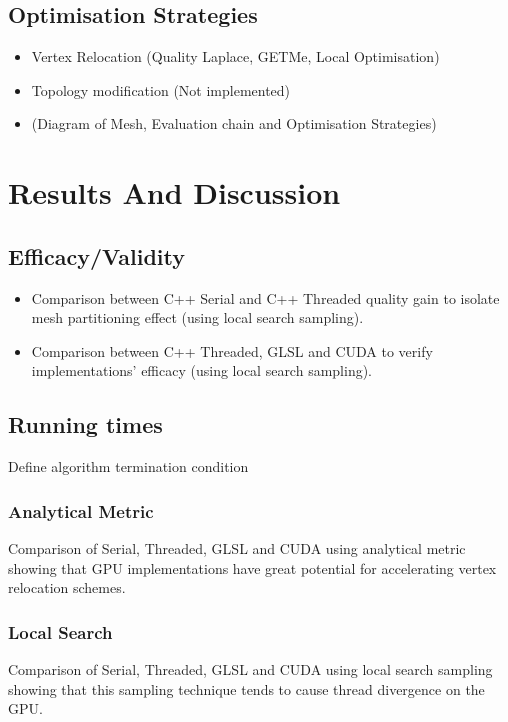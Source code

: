 \documentclass[preprint,12pt]{elsarticle}
\begin{document}
\subsection{Optimisation Strategies}
\label{}
\begin{itemize}
\item Vertex Relocation (Quality Laplace, GETMe, Local Optimisation)
\item Topology modification (Not implemented)
\item (Diagram of Mesh, Evaluation chain and Optimisation Strategies)
\end{itemize}

\section{Results And Discussion}
\label{}

\subsection{Efficacy/Validity}
\label{}
\begin{itemize}
\item Comparison between C++ Serial and C++ Threaded quality gain to isolate mesh partitioning effect (using local search sampling).
\item Comparison between C++ Threaded, GLSL and CUDA to verify implementations' efficacy (using local search sampling).
\end{itemize}


\subsection{Running times}
\label{}
Define algorithm termination condition

\subsubsection{Analytical Metric}
\label{}
Comparison of Serial, Threaded, GLSL and CUDA using analytical metric showing that GPU implementations have great potential for accelerating vertex relocation schemes.

\subsubsection{Local Search}
\label{}
Comparison of Serial, Threaded, GLSL and CUDA using local search sampling showing that this sampling technique tends to cause thread divergence on the GPU. 
\end{document}
